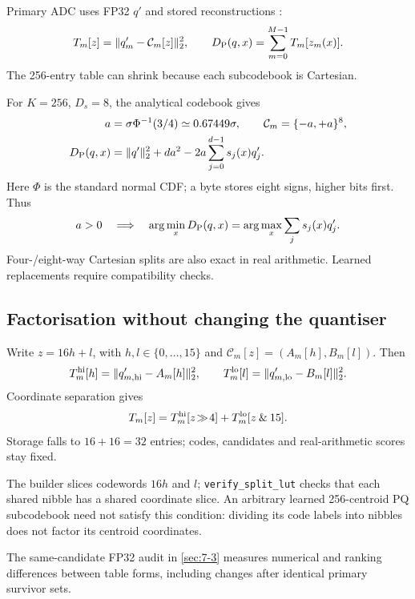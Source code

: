 Primary ADC uses FP32 $q'$ and stored reconstructions \cite{pq,jhq}:
\begin{equation}
 T_m[z]=\|q'_m-\mathcal C_m[z]\|_2^2,\qquad
 D_{\mathrm{P}}(q,x)=\sum_{m=0}^{M-1}T_m[z_m(x)].
 \label{eq:5-primary-lut}
\end{equation}
The 256-entry table can shrink because each subcodebook is Cartesian.

For $K=256$, $D_s=8$, the analytical codebook gives
\begin{equation}
 \begin{aligned}
 a&=\sigma\Phi^{-1}(3/4)\simeq0.67449\sigma,\qquad
 \mathcal C_m=\{-a,+a\}^{8},\\
 D_{\mathrm{P}}(q,x)&=\|q'\|_2^2+da^2
       -2a\sum_{j=0}^{d-1}s_j(x)q'_j.
 \end{aligned}
 \label{eq:5-sign-codebook}
\end{equation}
Here $\Phi$ is the standard normal CDF; a byte stores eight signs, higher bits first. Thus
\[
 a>0\quad\Longrightarrow\quad
 \arg\min_xD_{\mathrm{P}}(q,x)=\arg\max_x\sum_j s_j(x)q'_j.
\]
Four-/eight-way Cartesian splits are also exact in real arithmetic. Learned replacements require compatibility checks.

\subsection{Factorisation without changing the quantiser}

Write $z=16h+l$, with $h,l\in\{0,\ldots,15\}$ and $\mathcal C_m[z]=(A_m[h],B_m[l])$. Then
\begin{equation}
 T_m^{\rm hi}[h]=\|q'_{m,\rm hi}-A_m[h]\|_2^2,\qquad
 T_m^{\rm lo}[l]=\|q'_{m,\rm lo}-B_m[l]\|_2^2.
 \label{eq:5-lut-halves}
\end{equation}
Coordinate separation gives
\begin{equation}
 T_m[z]=T_m^{\rm hi}[z\!\gg\!4]
        +T_m^{\rm lo}[z\mathbin{\&}15].
 \label{eq:5-lut-factorisation}
\end{equation}
Storage falls to $16+16=32$ entries; codes, candidates and real-arithmetic scores stay fixed.

The builder slices codewords $16h$ and $l$; \texttt{verify\_split\_lut} checks that each shared nibble has a shared coordinate slice.
An arbitrary learned 256-centroid PQ subcodebook need not satisfy this
condition: dividing its code labels into nibbles does not factor its
centroid coordinates.

The same-candidate FP32 audit in \cref{sec:7-3} measures numerical
and ranking differences between table forms, including changes after
identical primary survivor sets.


